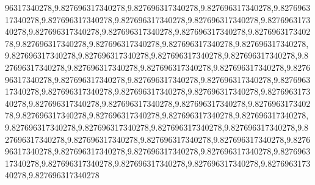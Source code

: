 96317340278,9.827696317340278,9.827696317340278,9.827696317340278,9.827696317340278,9.827696317340278,9.827696317340278,9.827696317340278,9.827696317340278,9.827696317340278,9.827696317340278,9.827696317340278,9.827696317340278,9.827696317340278,9.827696317340278,9.827696317340278,9.827696317340278,9.827696317340278,9.827696317340278,9.827696317340278,9.827696317340278,9.827696317340278,9.827696317340278,9.827696317340278,9.827696317340278,9.827696317340278,9.827696317340278,9.827696317340278,9.827696317340278,9.827696317340278,9.827696317340278,9.827696317340278,9.827696317340278,9.827696317340278,9.827696317340278,9.827696317340278,9.827696317340278,9.827696317340278,9.827696317340278,9.827696317340278,9.827696317340278,9.827696317340278,9.827696317340278,9.827696317340278,9.827696317340278,9.827696317340278,9.827696317340278,9.827696317340278,9.827696317340278,9.827696317340278,9.827696317340278,9.827696317340278,9.827696317340278,9.827696317340278,9.827696317340278,9.827696317340278,9.827696317340278,9.827696317340278,9.827696317340278,9.827696317340278
